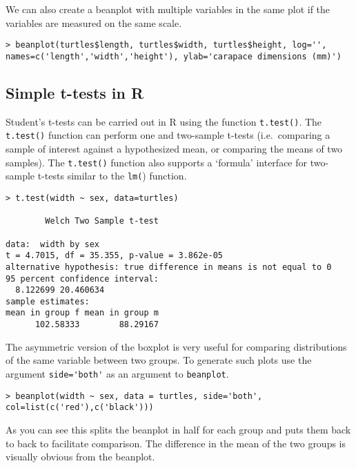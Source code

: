 We can also create a beanplot with multiple variables in the same plot
if the variables are measured on the same scale.

\begin{lstlisting}
> beanplot(turtles$length, turtles$width, turtles$height, log='',
names=c('length','width','height'), ylab='carapace dimensions (mm)') 
\end{lstlisting}
\subsection{Simple t-tests in R}

Student's t-tests can be carried out in R using the function
\lstinline!t.test()!. The \lstinline!t.test()! function can perform one
and two-sample t-tests (i.e.~comparing a sample of interest against a
hypothesized mean, or comparing the means of two samples). The
\lstinline!t.test()! function also supports a `formula' interface for
two-sample t-tests similar to the \lstinline!lm(!) function.

\begin{lstlisting}
> t.test(width ~ sex, data=turtles)

        Welch Two Sample t-test

data:  width by sex 
t = 4.7015, df = 35.355, p-value = 3.862e-05
alternative hypothesis: true difference in means is not equal to 0 
95 percent confidence interval:
  8.122699 20.460634 
sample estimates:
mean in group f mean in group m 
      102.58333        88.29167 
\end{lstlisting}
The asymmetric version of the boxplot is very useful for comparing
distributions of the same variable between two groups. To generate such
plots use the argument \lstinline!side='both'! as an argument to
\lstinline!beanplot!.

\begin{lstlisting}
> beanplot(width ~ sex, data = turtles, side='both', col=list(c('red'),c('black')))  
\end{lstlisting}
As you can see this splits the beanplot in half for each group and puts
them back to back to facilitate comparison. The difference in the mean
of the two groups is visually obvious from the beanplot.

